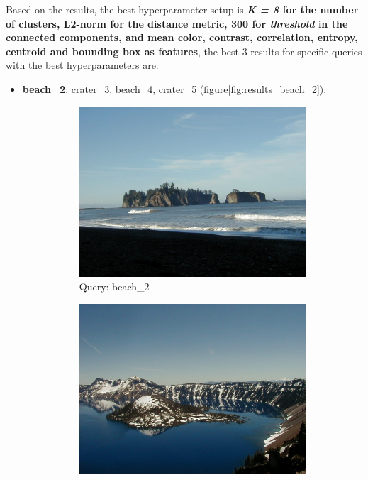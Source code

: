 Based on the results, the best hyperparameter setup is \textbf{\textit{K = 8} for the number of clusters, L2-norm for the distance metric, 300 for \textit{threshold} in the connected components, and mean color, contrast, correlation, entropy, centroid and bounding box as features}, the best 3 results for  specific queries with the best hyperparameters are:


\begin{itemize}
\item \textbf{beach\_2}: crater\_3, beach\_4, crater\_5 (figure\ref{fig:results_beach_2}).

\begin{figure}[H]
	\centering
	\begin{subfigure}{0.25\textwidth}
	  \centering
	  \includegraphics[width=0.9\linewidth]{../input/beach_2.jpg}
	  \caption{Query: beach\_2}
	\end{subfigure}%
	\begin{subfigure}{0.25\textwidth}
	  \centering
	  \includegraphics[width=0.9\linewidth]{../input/crater_3.jpg}

\end{subfigure}
\end{figure}
\end{itemize}

